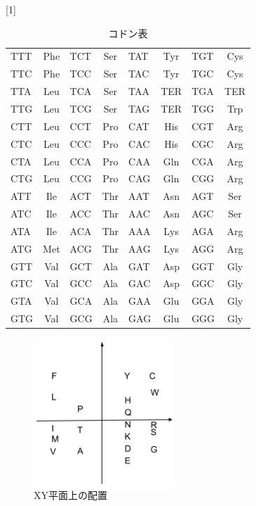 \documentclass[a4paper,12pt]{jsreport}
\begin{document}
\begin{table}[H]
\centering
\caption{コドン表}
\scalebox{1}[1]{
\begin{tabular}{|lc|lc|lc|lc|} \hline
TTT & Phe & TCT & Ser & TAT & Tyr & TGT & Cys \\[-2mm] 
TTC & Phe & TCC & Ser & TAC & Tyr & TGC & Cys \\[-2mm]
TTA & Leu & TCA & Ser & TAA & TER & TGA & TER \\[-2mm]
TTG & Leu & TCG & Ser & TAG & TER & TGG & Trp \\ \hline
CTT & Leu & CCT & Pro & CAT & His & CGT & Arg \\[-2mm]
CTC & Leu & CCC & Pro & CAC & His & CGC & Arg \\[-2mm]
CTA & Leu & CCA & Pro & CAA & Gln & CGA & Arg \\[-2mm]
CTG & Leu & CCG & Pro & CAG & Gln & CGG & Arg \\ \hline
ATT & Ile & ACT & Thr & AAT & Asn & AGT & Ser \\[-2mm]
ATC & Ile & ACC & Thr & AAC & Asn & AGC & Ser \\[-2mm]
ATA & Ile & ACA & Thr & AAA & Lys & AGA & Arg \\[-2mm]
ATG & Met & ACG & Thr & AAG & Lys & AGG & Arg \\ \hline
GTT & Val & GCT & Ala & GAT & Asp & GGT & Gly \\[-2mm]
GTC & Val & GCC & Ala & GAC & Asp & GGC & Gly \\[-2mm]
GTA & Val & GCA & Ala & GAA & Glu & GGA & Gly \\[-2mm]
GTG & Val & GCG & Ala & GAG & Glu & GGG & Gly \\ \hline
\end{tabular}
}
\end{table}

\begin{figure}[H]
\centering
\includegraphics[width=53mm]{pic04.png}
\caption{XY平面上の配置}
\end{figure}
\end{document}
